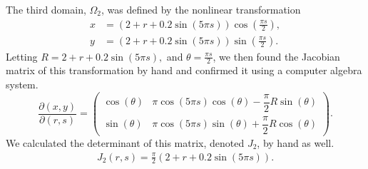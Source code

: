 \documentclass[12pt]{article}
\begin{document}
\noindent The third domain, $\Omega_2$, was defined by the nonlinear transformation
\begin{equation}
    \begin{aligned}
        x &= \left(2+r+0.2\sin(5\pi s)\right)
        \cos\left(\frac{\pi s}{2}\right),\\
        y &= \left(2+r+0.2\sin(5\pi s)\right)
        \sin\left(\frac{\pi s}{2}\right).
    \end{aligned}
\end{equation}
Letting $R=2+r+0.2\sin(5\pi s),$ and $ \theta=\frac{\pi s}{2}$, we then found the Jacobian matrix of this transformation by hand and confirmed it using a computer algebra system. 
\begin{equation}
    \frac{\partial(x,y)}{\partial(r,s)}
    =
    \begin{pmatrix}
        \cos(\theta) &
        \pi\cos(5\pi s)\cos(\theta)
        -\dfrac{\pi}{2}R\sin(\theta)\\[6pt]
        \sin(\theta) &
        \pi\cos(5\pi s)\sin(\theta)
        +\dfrac{\pi}{2}R\cos(\theta)
    \end{pmatrix}.
\end{equation}
We calculated the determinant of this matrix, denoted $J_2$, by hand as well.
\begin{align}
    J_2(r,s) = \frac{\pi}{2}
       \left(2+r+0.2\sin(5\pi s)\right).
\end{align}
\end{document}
